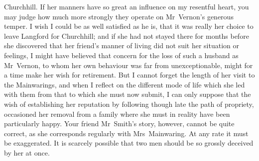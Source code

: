 \begin{mail}{Churchhill.}{}
If her manners have so great an influence on my resentful heart, you may judge how much more strongly they operate on Mr~Vernon's generous temper. I wish I could be as well satisfied as he is, that it was really her choice to leave Langford for Churchhill; and if she had not stayed there for months before she discovered that her friend's manner of living did not suit her situation or feelings, I might have believed that concern for the loss of such a husband as Mr~Vernon, to whom her own behaviour was far from unexceptionable, might for a time make her wish for retirement. But I cannot forget the length of her visit to the Mainwarings, and when I reflect on the different mode of life which she led with them from that to which she must now submit, I can only suppose that the wish of establishing her reputation by following though late the path of propriety, occasioned her removal from a family where she must in reality have been particularly happy. Your friend Mr~Smith's story, however, cannot be quite correct, as she corresponds regularly with Mrs~Mainwaring. At any rate it must be exaggerated. It is scarcely possible that two men should be so grossly deceived by her at once. 

\end{mail}